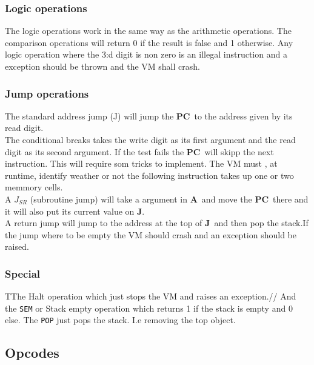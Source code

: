 \documentclass{article}
\newcommand{\A}{$\textbf{A}$}
\newcommand{\pc}{$\textbf{PC}$}
\newcommand{\J}{$\textbf{J}$}
\newcommand{\V}{\verb}
\begin{document}
\subsubsection{Logic operations}
The logic operations work in the same way as the arithmetic operations. The
comparison operations will return 0 if the result is false and 1 otherwise.
Any logic operation where the 3:d digit is non zero is an illegal instruction
and a exception should be thrown and the VM shall crash.

\subsubsection{Jump operations}
The standard address jump (J) will jump the \pc \ to the address given by its
read digit.\\
The conditional breaks takes the write digit as its first argument and the read
digit as its second argument. If the test fails the \pc \ will skipp the next
instruction. This will require som tricks to implement. The VM must , at
runtime, identify weather or not the following instruction takes up one or two
memmory cells.\\

A $J_{SR}$ (subroutine jump) will take a argument in \A \ and move the \pc \
there and it will also put its current value on \J.\\
A return jump will jump to the address at the top of \J \ and then pop the
stack.If the jump where to be empty the VM should crash and an exception
should be raised.\\


\subsubsection{Special}
TThe Halt operation which just stops the VM and
raises an exception.//
And the \V+SEM+ or Stack empty operation which returns 1 if the stack is empty
and 0 else.
The \V+POP+ just pops the stack. I.e removing the top object.

\subsection{Opcodes}
\end{document}
